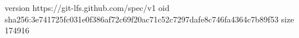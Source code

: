 version https://git-lfs.github.com/spec/v1
oid sha256:3e741725fc031e0f386af72c69f20ac71c52c7297dafe8c746fa4364c7b89f53
size 174916
